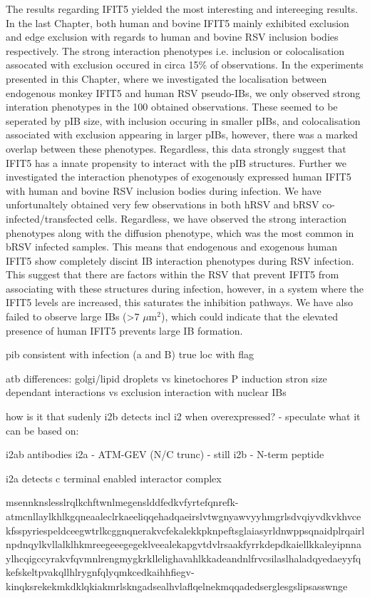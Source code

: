 The results regarding IFIT5 yielded the most interesting and intereeging results. In the last Chapter, both human and bovine IFIT5 mainly exhibited exclusion and edge exclusion with regards to human and bovine RSV inclusion bodies respectively. The strong interaction phenotypes i.e. inclusion or colocalisation assocated with exclusion occured in circa 15\% of observations. In the experiments presented in this Chapter, where we investigated the localisation between endogenous monkey IFIT5 and human RSV pseudo-IBs, we only observed strong interation phenotypes in the 100 obtained observations. These seemed to be seperated by pIB size, with inclusion occuring in smaller pIBs, and colocalisation associated with exclusion appearing in larger pIBs, however, there was a marked overlap between these phenotypes. Regardless, this data strongly suggest that IFIT5 has a innate propensity to interact with the pIB structures. Further we investigated the interaction phenotypes of exogenously expressed human IFIT5 with human and bovine RSV inclusion bodies during infection. We have unfortunaltely obtained very few observations in both hRSV and bRSV co-infected/transfected cells. Regardless, we have observed the strong interaction phenotypes along with the diffusion phenotype, which was the most common in bRSV infected samples. This means that endogenous and exogenous human IFIT5 show completely discint IB interaction phenotypes during RSV infection. This suggest that there are factors within the RSV that prevent IFIT5 from associating with these structures during infection, however, in a system where the IFIT5 levels are increased, this saturates the inhibition pathways. We have also failed to observe large IBs (>7 \(\mu \mbox{m}^2\)), which could indicate that the elevated presence of human IFIT5 prevents large IB formation. 

pib consistent with infection (a and B)
true loc with flag

atb differences:
golgi/lipid droplets vs kinetochores
P induction
stron size dependant interactions vs exclusion
interaction with nuclear IBs

how is it that sudenly i2b detects incl i2 when overexpressed?
- speculate what it can be based on:

i2ab antibodies
i2a - ATM-GEV (N/C trunc) - still 
i2b - N-term peptide

i2a detects c terminal enabled interactor complex

msennknslesslrqlkchftwnlmegenslddfedkvfyrtefqnrefk-atmcnllaylkhlkgqneaaleclrkaeeliqqehadqaeirslvtwgnyawvyyhmgrlsdvqiyvdkvkhvcekfsspyriespeldceegwtrlkcggnqnerakvcfekalekkpknpeftsglaiasyrldnwppsqnaidplrqairlnpdnqylkvllalklhkmreegeeegegeklveealekapgvtdvlrsaakfyrrkdepdkaiellkkaleyipnnaylhcqigccyrakvfqvmnlrengmygkrkllelighavahlkkadeandnlfrvcsilaslhaladqyedaeyyfqkefskeltpvakqllhlrygnfqlyqmkcedkaihhfiegv-kinqksrekekmkdklqkiakmrlskngadsealhvlaflqelnekmqqadedserglesgslipsasswnge

